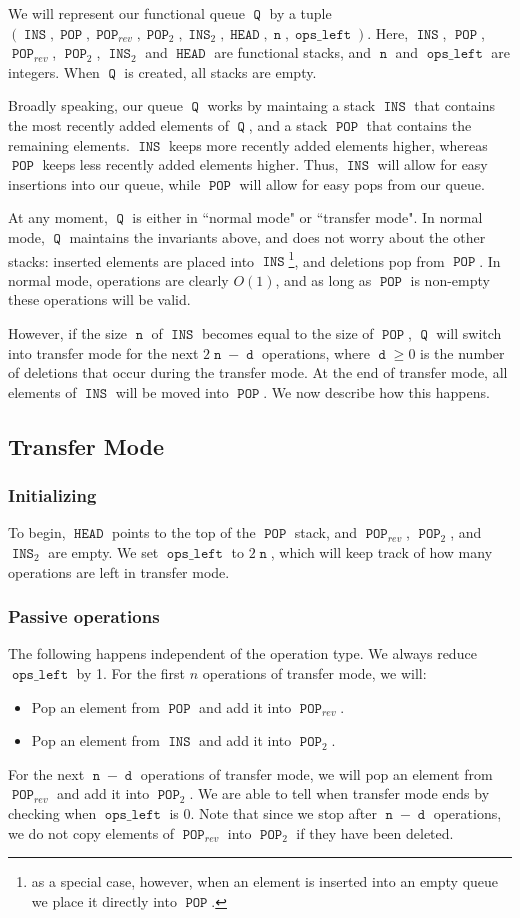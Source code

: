 \documentclass[12.5pt]{scrartcl}
\DeclareMathOperator{\INS}{\mathtt{INS}}
\DeclareMathOperator{\POP}{\mathtt{POP}}
\DeclareMathOperator{\HEAD}{\mathtt{HEAD}}
\DeclareMathOperator{\opsleft}{\mathtt{ops\_left}}
\DeclareMathOperator{\n}{\mathtt{n}}
\DeclareMathOperator{\dd}{\mathtt{d}}
\DeclareMathOperator{\Q}{\mathtt{Q}}
\begin{document}
We will represent our functional queue $\Q$ by a tuple $(\INS, \POP, \POP_{rev}, \POP_2, \INS_2,\HEAD, \n, \opsleft)$. Here, $\INS$, $\POP$, $\POP_{rev}$, $\POP_2$, $\INS_2$ and $\HEAD$ are functional stacks, and $\n$ and $\opsleft$ are integers. When $\Q$ is created, all stacks are empty. 

Broadly speaking, our queue $\Q$ works by maintaing a stack $\INS$ that contains the most recently added elements of $\Q$, and a stack $\POP$ that contains the remaining elements. $\INS$ keeps more recently added elements higher, whereas $\POP$ keeps less recently added elements higher. Thus, $\INS$ will allow for easy insertions into our queue, while $\POP$ will allow for easy pops from our queue. 

At any moment, $\Q$ is either in ``normal mode" or ``transfer mode". In normal mode, $\Q$ maintains the invariants above, and does not worry about the other stacks: inserted elements are placed into $\INS$\footnote{as a special case, however, when an element is inserted into an empty queue we place it directly into $\POP$.}, and deletions pop from $\POP$. In normal mode, operations are clearly $O(1)$, and as long as $\POP$ is non-empty these operations will be valid. 

However, if the size $\n$ of $\INS$ becomes equal to the size of $\POP$, $\Q$ will switch into transfer mode for the next $2\n - \dd$ operations, where $\dd \geq 0$ is the number of deletions that occur during the transfer mode. At the end of transfer mode, all elements of $\INS$ will be moved into $\POP$. We now describe how this happens. 

\subsection{Transfer Mode}

\subsubsection{Initializing} To begin, $\HEAD$ points to the top of the $\POP$ stack, and $\POP_{rev}$, $\POP_2$, and $\INS_2$ are empty. We set $\opsleft$ to $2\n$, which will keep track of how many operations are left in transfer mode.

\subsubsection{Passive operations} The following happens independent of the operation type. We always reduce $\opsleft$ by 1. For the first $n$ operations of transfer mode, we will:
\begin{itemize}
	\item Pop an element from $\POP$ and add it into $\POP_{rev}$.
	\item Pop an element from $\INS$ and add it into $\POP_2$.
\end{itemize}
For the next $\n - \dd$ operations of transfer mode, we will pop an element from $\POP_{rev}$ and add it into $\POP_2$. We are able to tell when transfer mode ends by checking when $\opsleft$ is 0. Note that since we stop after $\n-\dd$ operations, we do not copy elements of $\POP_{rev}$ into $\POP_2$ if they have been deleted.     
\end{document}
